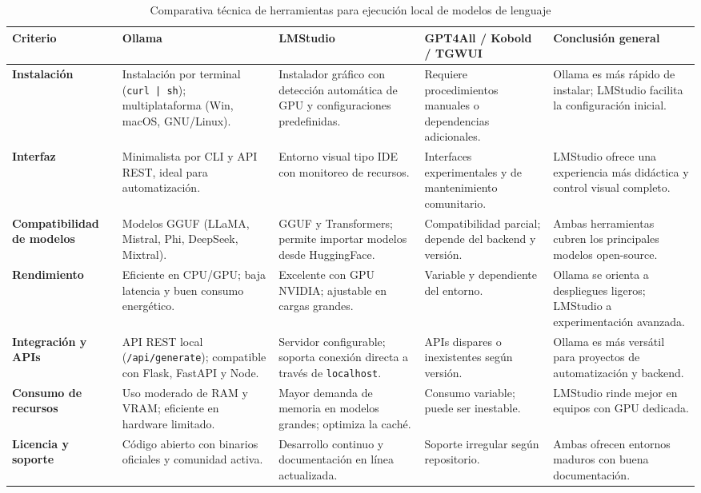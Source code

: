 \documentclass[12pt,a4paper]{report}
\numberwithin{figure}{section}
\begin{document}
\vspace{0.5em}

\begin{table}[!hbtp]
\centering
\footnotesize %
\renewcommand{\arraystretch}{1.3}
\setlength{\tabcolsep}{3pt}
\caption{Comparativa técnica de herramientas para ejecución local de modelos de lenguaje}
\label{tab:comparativa_llm_local}
\begin{tabularx}{\textwidth}{@{}p{3cm} p{3.2cm} p{3.2cm} p{3.2cm} X@{}}
\toprule
\textbf{Criterio} & \textbf{Ollama} & \textbf{LMStudio} & \textbf{GPT4All / Kobold / TGWUI} & \textbf{Conclusión general} \\ \midrule
\textbf{Instalación} &
Instalación por terminal (\texttt{curl | sh}); multiplataforma (Win, macOS, GNU/Linux). &
Instalador gráfico con detección automática de GPU y configuraciones predefinidas. &
Requiere procedimientos manuales o dependencias adicionales. &
Ollama es más rápido de instalar; LMStudio facilita la configuración inicial. \\ \midrule
\textbf{Interfaz} &
Minimalista por CLI y API REST, ideal para automatización. &
Entorno visual tipo IDE con monitoreo de recursos. &
Interfaces experimentales y de mantenimiento comunitario. &
LMStudio ofrece una experiencia más didáctica y control visual completo. \\ \midrule
\textbf{Compatibilidad de modelos} &
Modelos GGUF (LLaMA, Mistral, Phi, DeepSeek, Mixtral). &
GGUF y Transformers; permite importar modelos desde HuggingFace. &
Compatibilidad parcial; depende del backend y versión. &
Ambas herramientas cubren los principales modelos open-source. \\ \midrule
\textbf{Rendimiento} &
Eficiente en CPU/GPU; baja latencia y buen consumo energético. &
Excelente con GPU NVIDIA; ajustable en cargas grandes. &
Variable y dependiente del entorno. &
Ollama se orienta a despliegues ligeros; LMStudio a experimentación avanzada. \\ \midrule
\textbf{Integración y APIs} &
API REST local (\texttt{/api/generate}); compatible con Flask, FastAPI y Node. &
Servidor configurable; soporta conexión directa a través de \texttt{localhost}. &
APIs dispares o inexistentes según versión. &
Ollama es más versátil para proyectos de automatización y backend. \\ \midrule
\textbf{Consumo de recursos} &
Uso moderado de RAM y VRAM; eficiente en hardware limitado. &
Mayor demanda de memoria en modelos grandes; optimiza la caché. &
Consumo variable; puede ser inestable. &
LMStudio rinde mejor en equipos con GPU dedicada. \\ \midrule
\textbf{Licencia y soporte} &
Código abierto con binarios oficiales y comunidad activa. &
Desarrollo continuo y documentación en línea actualizada. &
Soporte irregular según repositorio. &
Ambas ofrecen entornos maduros con buena documentación. \\
\bottomrule
\end{tabularx}
\end{table}
\end{document}
